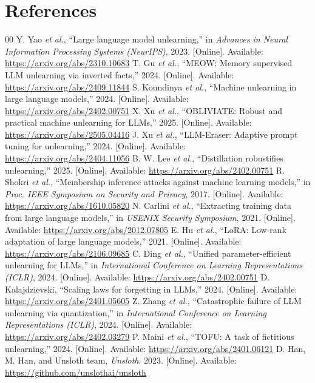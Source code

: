 \documentclass[conference]{IEEEtran}
\begin{document}
\section*{References}
\begin{thebibliography}{00}
 Y. Yao \emph{et al.}, ``Large language model unlearning,'' in \emph{Advances in Neural Information Processing Systems (NeurIPS)}, 2023. [Online]. Available: \url{https://arxiv.org/abs/2310.10683}
 T. Gu \emph{et al.}, ``MEOW: Memory supervised LLM unlearning via inverted facts,'' 2024. [Online]. Available: \url{https://arxiv.org/abs/2409.11844}
 S. Koundinya \emph{et al.}, ``Machine unlearning in large language models,'' 2024. [Online]. Available: \url{https://arxiv.org/abs/2402.00751}
 X. Xu \emph{et al.}, ``OBLIVIATE: Robust and practical machine unlearning for LLMs,'' 2025. [Online]. Available: \url{https://arxiv.org/abs/2505.04416}
 J. Xu \emph{et al.}, ``LLM-Eraser: Adaptive prompt tuning for unlearning,'' 2024. [Online]. Available: \url{https://arxiv.org/abs/2404.11056}
 B. W. Lee \emph{et al.}, ``Distillation robustifies unlearning,'' 2025. [Online]. Available: \url{https://arxiv.org/abs/2402.00751}
 R. Shokri \emph{et al.}, ``Membership inference attacks against machine learning models,'' in \emph{Proc. IEEE Symposium on Security and Privacy}, 2017. [Online]. Available: \url{https://arxiv.org/abs/1610.05820}
 N. Carlini \emph{et al.}, ``Extracting training data from large language models,'' in \emph{USENIX Security Symposium}, 2021. [Online]. Available: \url{https://arxiv.org/abs/2012.07805}
 E. Hu \emph{et al.}, ``LoRA: Low-rank adaptation of large language models,'' 2021. [Online]. Available: \url{https://arxiv.org/abs/2106.09685}
 C. Ding \emph{et al.}, ``Unified parameter-efficient unlearning for LLMs,'' in \emph{International Conference on Learning Representations (ICLR)}, 2024. [Online]. Available: \url{https://arxiv.org/abs/2402.00751}
 D. Kalajdzievski, ``Scaling laws for forgetting in LLMs,'' 2024. [Online]. Available: \url{https://arxiv.org/abs/2401.05605}
 Z. Zhang \emph{et al.}, ``Catastrophic failure of LLM unlearning via quantization,'' in \emph{International Conference on Learning Representations (ICLR)}, 2024. [Online]. Available: \url{https://arxiv.org/abs/2402.03279}
 P. Maini \emph{et al.}, ``TOFU: A task of fictitious unlearning,'' 2024. [Online]. Available: \url{https://arxiv.org/abs/2401.06121}
 D. Han, M. Han, and Unsloth team, \emph{Unsloth}. 2023. [Online]. Available: \url{https://github.com/unslothai/unsloth}
\end{thebibliography}
\end{document}
